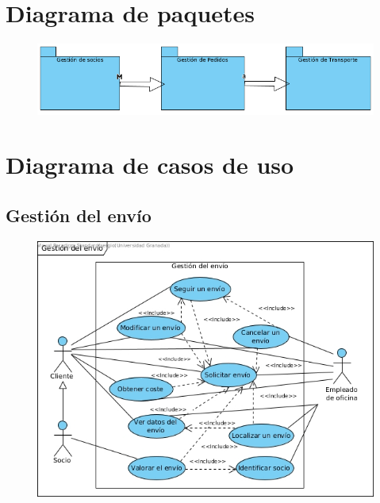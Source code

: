 \section{Diagrama de paquetes}
\begin{figure}[h]
	\centering
	\includegraphics[width=15cm]{diagra_paquetes}
\end{figure}
\newpage

\section{Diagrama de casos de uso}
\subsection{Gestión del envío}
\begin{figure}[h]
	\centering
		\includegraphics[width=15cm]{diagr_envio}
\end{figure}

\newpage

